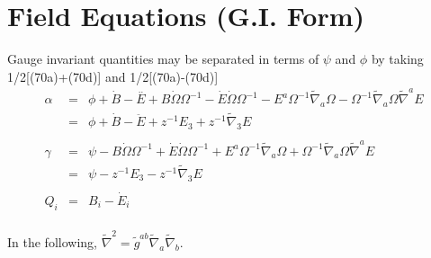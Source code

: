 \documentclass[10pt,letterpaper]{article}
\numberwithin{equation}{section}
\begin{document}
\section{Field Equations (G.I. Form)}
Gauge invariant quantities may be separated in terms of $\psi$ and $\phi$ by taking 1/2[(70a)+(70d)] and 1/2[(70a)-(70d)]
\begin{eqnarray}
\alpha &=& \phi+ \dot{B} -  \overset{..}{E} + B \dot{\Omega} \Omega^{-1} -  \dot{E} \dot{\Omega} \Omega^{-1} -  E^{a} \Omega^{-1} \tilde{\nabla}_{a}\Omega -  \Omega^{-1} \tilde{\nabla}_{a}\Omega \tilde{\nabla}^{a}E
\nonumber\\
&=& \phi + \dot B - \ddot E + z^{-1}E_3+ z^{-1} \tilde\nabla_3 E
\\ \nonumber\\
\gamma &=& \psi -  B \dot{\Omega} \Omega^{-1} + \dot{E} \dot{\Omega} \Omega^{-1} + E^{a} \Omega^{-1} \tilde{\nabla}_{a}\Omega + \Omega^{-1} \tilde{\nabla}_{a}\Omega \tilde{\nabla}^{a}E
\nonumber\\
&=& \psi - z^{-1}E_3 - z^{-1}\tilde\nabla_3 E
\\ \nonumber\\
Q_i &=& B_i-\dot E_i
\end{eqnarray}
\\
In the following, $\tilde\nabla^{2} = \tilde g^{ab} \tilde\nabla_a\tilde\nabla_b$. 
\\
\end{document}
